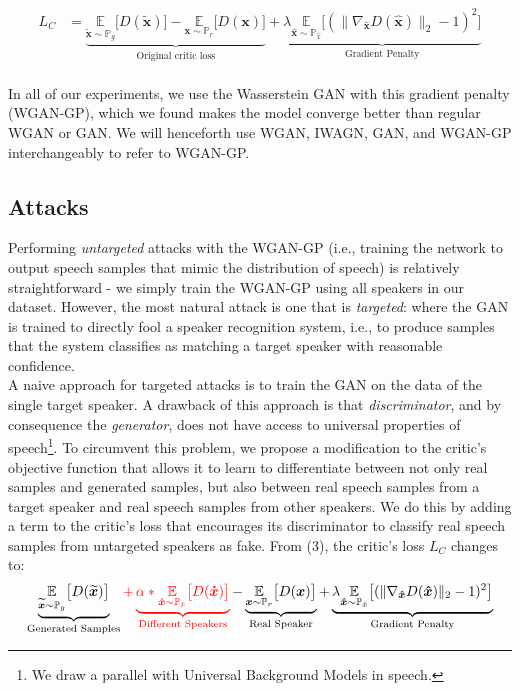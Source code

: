 \begin{align}
    L_C &= \underbrace{\underset{\boldsymbol{\widetilde{x}} \sim \mathbb{P}_{g}}{\mathbb{E}}  \big[D(\boldsymbol{\widetilde{x}})\big] - \underset{\boldsymbol{x} \sim \mathbb{P}_{r}}{\mathbb{E}}  \big[D(\boldsymbol{x})\big]}_\text{Original critic loss}  + \underbrace{\lambda \underset{\boldsymbol{\hat{x}} \sim \mathbb{P}_{\hat{x}}}{\mathbb{E}}  \big[(\lVert \nabla_{\boldsymbol{\hat{x}}} D(\boldsymbol{\hat{x}}) \rVert_2 - 1)^2\big]}_\text{Gradient Penalty}
\end{align} \\
In all of our experiments, we use the Wasserstein GAN with this gradient penalty (WGAN-GP), which we found makes the model converge better than regular WGAN or GAN. We will henceforth use WGAN, IWAGN, GAN, and WGAN-GP interchangeably to refer to WGAN-GP.
\subsection{Attacks}
Performing \textit{untargeted} attacks with the WGAN-GP (i.e., training the network to output speech samples that mimic the distribution of speech) is relatively straightforward - we simply train the WGAN-GP using all speakers in our dataset. However, the most natural attack is one that is \textit{targeted}: where the GAN is trained to directly fool
a speaker recognition system, i.e., to produce samples that the system classifies as matching a target speaker with reasonable confidence. \\
A naive approach for targeted attacks is to train the GAN on the data of the single target speaker. A drawback of this approach is that \textit{discriminator}, and by consequence the \textit{generator}, does not have access to universal properties of speech\footnote{We draw a parallel with 
Universal Background Models in speech.}. To circumvent this problem, we propose a 
modification to the critic's objective function that allows it to learn to 
differentiate between not only real samples and generated samples, but also between real speech samples from a target 
speaker and real speech samples from other speakers. We do this by adding a term 
to the critic's loss that encourages its discriminator to classify real speech 
samples from untargeted speakers as fake. From (3), the critic's loss $L_C$ changes to:
\begin{align}
    \underbrace{\underset{\boldsymbol{\widetilde{x}} \sim \mathbb{P}_{g}}{\mathbb{E}}  \big[D(\boldsymbol{\widetilde{x}})\big]}_\text{Generated Samples} \color{red} +  \underbrace{\alpha * \underset{\boldsymbol{\dot{x}} \sim \mathbb{P}_{\dot{x}}}{\mathbb{E}}  \big[D(\boldsymbol{\dot{x}})\big]}_\text{Different Speakers} \color{black} - \underbrace{\underset{\boldsymbol{x} \sim \mathbb{P}_{r}}{\mathbb{E}}  \big[D(\boldsymbol{x})\big]}_\text{Real Speaker}  + \underbrace{\lambda \underset{\boldsymbol{\hat{x}} \sim \mathbb{P}_{\hat{x}}}{\mathbb{E}}  \big[(\lVert \nabla_{\boldsymbol{\hat{x}}} D(\boldsymbol{\hat{x}}) \rVert_2 - 1)^2\big]}_\text{Gradient Penalty}
\end{align}
